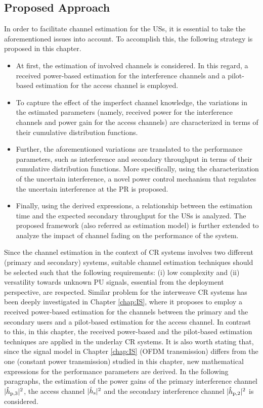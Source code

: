 \subsection{Proposed Approach} 
In order to facilitate channel estimation for the USs, it is essential to take the aforementioned issues into account. To accomplish this, the following strategy is proposed in this chapter.
\begin{itemize}
\item At first, the estimation of involved channels is considered. In this regard, a received power-based estimation for the interference channels and a pilot-based estimation for the access channel is employed. 
\item To capture the effect of the imperfect channel knowledge, the variations in the estimated parameters (namely, received power for the interference channels and power gain for the access channels) are characterized in terms of their cumulative distribution functions.
\item Further, the aforementioned variations are translated to the performance parameters, such as interference and secondary throughput in terms of their cumulative distribution functions. More specifically, using the characterization of the uncertain interference, a novel power control mechanism that regulates the uncertain interference at the PR is proposed.  
\item Finally, using the derived expressions, a relationship between the estimation time and the expected secondary throughput for the USs is analyzed. The proposed framework (also referred as estimation model) is further extended to analyze the impact of channel fading on the performance of the system. 
\end{itemize}
Since the channel estimation in the context of CR systems involves two different (primary and secondary) systems, suitable channel estimation techniques should be selected such that the following requirements: (i) low complexity and (ii) versatility towards unknown PU signals, essential from the deployment perspective, are respected. Similar problem for the interweave CR systems has been deeply investigated in Chapter \ref{chap:IS}, where it proposes to employ a received power-based estimation for the channels between the primary and the secondary users and a pilot-based estimation for the access channel. In contrast to this, in this chapter, the received power-based and the pilot-based estimation techniques are applied in the underlay CR systems. It is also worth stating that, since the signal model in Chapter \ref{chap:IS} (OFDM transmission) differs from the one (constant power transmission) studied in this chapter, new mathematical expressions for the performance parameters are derived. 
In the following paragraphs, the estimation of the power gains of the primary interference channel $|\hat{h}_{\text{p,3}}|^2$, the access channel $|\hat{h}_{\text{s}}|^2$ and the secondary interference channel $|\hat{h}_{\text{p,2}}|^2$ is considered. 
